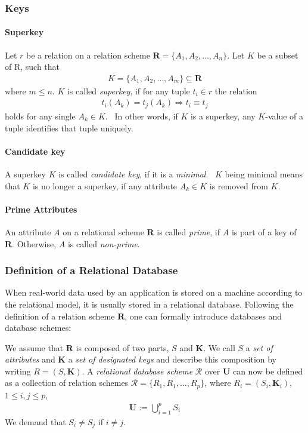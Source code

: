 \subsubsection{Keys}
\paragraph{Superkey}Let \( r \) be a relation on a relation scheme \( \boldsymbol{R} = \{ A_1, A_2, \dots, A_n \} \).
Let \( K \) be a subset of R, such that
\begin{align}
    K = \{ A_1, A_2, \dots, A_m \} \subseteq \boldsymbol{R}
\end{align}
where \( m \leq n \).
\( K \) is called \emph{superkey}, if for any tuple \( t_i \in r \) the relation
\begin{align*}
    t_i(A_k) = t_j(A_k) \Rightarrow t_i \equiv t_j
\end{align*}
holds for any single \( A_k \in K \).~\cite[p.~4]{MAI83}
In other words, if \( K \) is a superkey, any \( K \)-value of a tuple identifies that tuple uniquely.~\cite[p.~32]{SCH17}

\paragraph{Candidate key} A superkey \( K \) is called \emph{candidate key}, if it is a \emph{minimal}.~\cite[p.~32]{SCH17}
\( K \) being minimal means that \( K \) is no longer a superkey, if any attribute \( A_k \in K \) is removed from \( K \).

\paragraph{Prime Attributes} An attribute \( A \) on a relational scheme \( \boldsymbol{R} \) is called \emph{prime}, if \( A \) is part of a key of \( \boldsymbol{R} \).
Otherwise, \( A \) is called \emph{non-prime}.

\subsubsection{Definition of a Relational Database}
When real-world data used by an application is stored on a machine according to the relational model, it is usually stored in a relational database.
Following the definition of a relation scheme \( \boldsymbol{R} \), one can formally introduce databases and database schemes:

We assume that \( \boldsymbol{R}\) is composed of two parts, \(S\) and \(\boldsymbol{K}\). We call \(S\) a \emph{set of attributes} and \(\boldsymbol{K}\) a \emph{set of designated keys} and describe this composition by writing \(R = (S, \boldsymbol{K})\).
A \emph{relational database scheme} \( \mathcal{R} \) over \( \boldsymbol{U} \) can now be defined as a collection of relation schemes \( \mathcal{R} = \{R_1, R_1, \dots, R_p\} \), where \(R_i = (S_i, \boldsymbol{K}_i)\), \(1 \leq i, j \leq p\),
\begin{align*}
    \boldsymbol{U} := \bigcup^{p}_{i=1} S_i
\end{align*}
We demand that \(S_i \neq S_j\) if \(i \neq j\).

